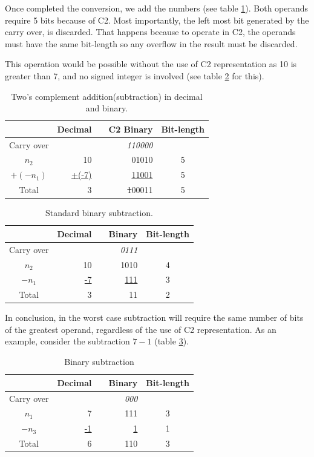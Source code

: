 \documentclass[10pt]{article}
\begin{document}
Once completed the conversion, we add the numbers (see table  \ref{tab:03}).
Both operands require 5 bits because of C2. Most importantly, the left most
bit generated by the carry over, is discarded. That happens because to operate
in C2, the operands must have the same bit-length so any overflow in the result
must be discarded.

This operation would be possible without the use of C2 representation as 10 is
greater than 7, and no signed integer is involved (see table \ref{tab:04} for
this).

\begin{table}[ht]
	\centering
    \caption{Two's complement addition(subtraction) in decimal and binary.}
    \begin{tabular}{crrrc}
    \hline
    	  & Decimal & & C2 Binary & Bit-length \\
    \hline      
    Carry over & 	& & \textit{110000} & \\
    $n_2$ & 10	& & 01010 & 5 \\
    $+(-n_1)$ & \underline{+(-7)} & & \underline{11001} & 5 \\
    Total & 3	& & \sout{1}00011 & 5 \\
    \hline
	\end{tabular}
    \label{tab:03}
\end{table}

\begin{table}[ht]
    \centering
    \caption{Standard binary subtraction.}
    \begin{tabular}{crrrc}
    \hline
    	  & Decimal & & Binary & Bit-length \\
    \hline      
    Carry over& 	& & \textit{0111} & \\
    $n_2$ & 10	& & 1010 & 4 \\
    $-n_1$ & \underline{-7} & & \underline{111} & 3 \\
    Total & 3	& & 11 & 2\\
    \hline
	\end{tabular}
    \label{tab:04}
\end{table}

In conclusion, in the worst case subtraction will require the same number of
bits of the greatest operand, regardless of the use of C2 representation. As an
example, consider the subtraction $7-1$ (table \ref{tab:05}).

\begin{table}[ht]
  \centering
  \caption{Binary subtraction}
  \begin{tabular}{crrrc}
    \hline
	  & Decimal & & Binary & Bit-length \\
    \hline      
    Carry over & 	& & \textit{000} & \\
    $n_1$ & 7	& & 111 & 3 \\
    $-n_3$ & \underline{-1} & & \underline{1} & 1 \\
    Total & 6	& & 110 & 3\\
    \hline
  \end{tabular}
  \label{tab:05}
\end{table}
\end{document}
